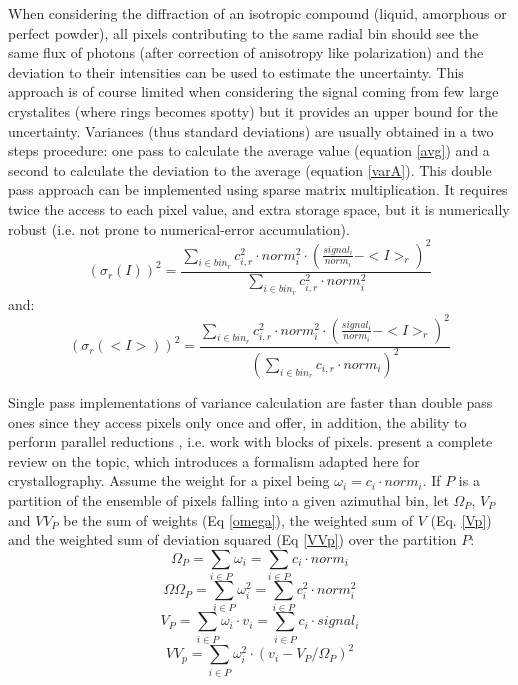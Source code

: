 \documentclass[preprint]{iucr}              %
\begin{document}
When considering the diffraction of an isotropic compound (liquid, amorphous or perfect powder), all pixels contributing to the same radial bin should see the same flux of photons (after correction of anisotropy like polarization) and the deviation to their intensities can be used to estimate the uncertainty. 
This approach is of course limited when considering the signal coming from few large crystalites (where rings becomes spotty) but it provides an upper bound for the uncertainty.
Variances (thus standard deviations) are usually obtained in a two steps procedure: one pass to calculate the average value (equation \ref{avg}) and a second to calculate the deviation to the average (equation \ref{varA}). 
This double pass approach can be implemented using sparse matrix multiplication. 
It requires twice the access to each pixel value, and extra storage space, but it is numerically robust (i.e. not prone to numerical-error accumulation).
\begin{equation}
\label{varA}
    (\sigma_{r}(I))^2 = \frac {\sum\limits_{i \in bin_r} c_{i,r}^2 \cdot norm_i^2 \cdot (\frac{signal_i}{norm_i}-<I>_r)^2}
                              {\sum\limits_{i \in bin_r} c_{i,r}^2 \cdot norm_i^2}
\end{equation}
and:
\begin{equation}
\label{varB}
(\sigma_{r}(<I>))^2 = \frac{\sum\limits_{i \in bin_r} c_{i,r}^2 \cdot norm_i^2 \cdot (\frac{signal_i}{norm_i}-<I>_r)^2}
                         {(\sum\limits_{i \in bin_r} c_{i,r} \cdot norm_i)^2}  
\end{equation}


Single pass implementations of variance calculation are faster than double pass ones since they access pixels only once and offer, in addition, the ability to perform parallel reductions \cite{Blelloch}, i.e. work with blocks of pixels.
 present a complete review on the topic, which introduces a formalism adapted here for crystallography.
Assume the weight for a pixel being $\omega_i = c_i \cdot norm_i$.
If $P$ is a partition of the ensemble of pixels falling into a given azimuthal bin, let $\Omega_{P}$, $V_{P}$ and $VV_{P}$  
be the sum of weights (Eq \ref{omega}), the weighted sum of $V$ (Eq. \ref{Vp}) and the weighted sum of deviation squared (Eq \ref{VVp}) over the partition $P$: 
\begin{equation}
\label{omega}
\Omega_{P} = \sum\limits_{i \in P} \omega_i = \sum\limits_{i \in P} c_i \cdot norm_i 
\end{equation}
\begin{equation}
\label{omegaomega}
\Omega\Omega_{P} = \sum\limits_{i \in P} \omega_i^2 = \sum\limits_{i \in P} c_i^2 \cdot norm_i^2 
\end{equation}
\begin{equation}
\label{Vp}
V_{P} = \sum\limits_{i \in P} \omega_i \cdot v_i =  \sum\limits_{i \in P} c_i \cdot signal_i
\end{equation}
\begin{equation}
\label{VVp}
VV_{p} = \sum\limits_{i \in P} \omega_i^2 \cdot (v_i - V_{P}/\Omega_{P})^2 
\end{equation}
\end{document}
